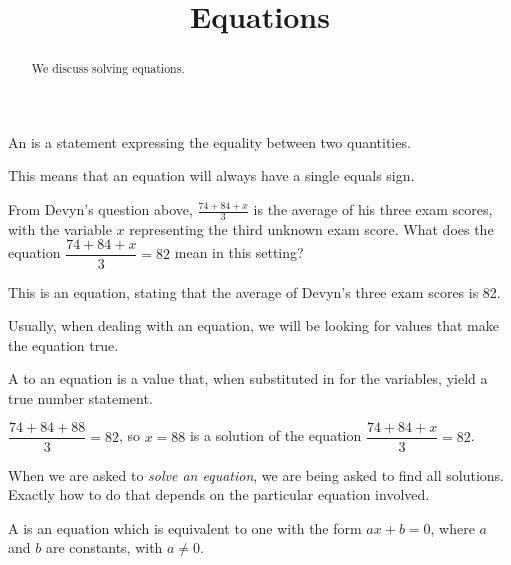 \documentclass{ximera}
\title[Dig-In:]{Equations}
\begin{document}
\begin{abstract}
  We discuss solving equations.
\end{abstract}
\maketitle

\begin{definition}
An  is a statement expressing the equality between two quantities.
\end{definition}
This means that an equation will always have a single equals sign.


\begin{example}
  From Devyn's question above, $\displaystyle \frac{74 + 84 + x}{3}$ is the average of his three exam 
  scores, with the variable $x$ representing the third unknown exam score.  What does the equation
  $\displaystyle \dfrac{74 + 84 + x}{3} = 82$ mean in this setting?
  
  \begin{explanation}
    This is an equation, stating that the average of Devyn's three exam scores is 82.
  \end{explanation}
\end{example}

Usually, when dealing with an equation, we will be looking for values that make the equation true.
\begin{definition}
A  to an equation is a value that, when substituted in for the variables,
yield a true number statement.
\end{definition}

\begin{example}
	$\displaystyle \dfrac{74 + 84 + 88}{3} = 82$, so $x = 88$ is a solution of the equation
	$\displaystyle \dfrac{74 + 84 + x}{3} = 82$.
\end{example}

When we are asked to \emph{solve an equation}, we are being asked to find all solutions.
Exactly how to do that depends on the particular equation involved.


\begin{definition}
	A  is an equation which is equivalent to one with the form
	$a x + b = 0$, where $a$ and $b$ are constants, with $a \neq 0$.
\end{definition}
\end{document}
